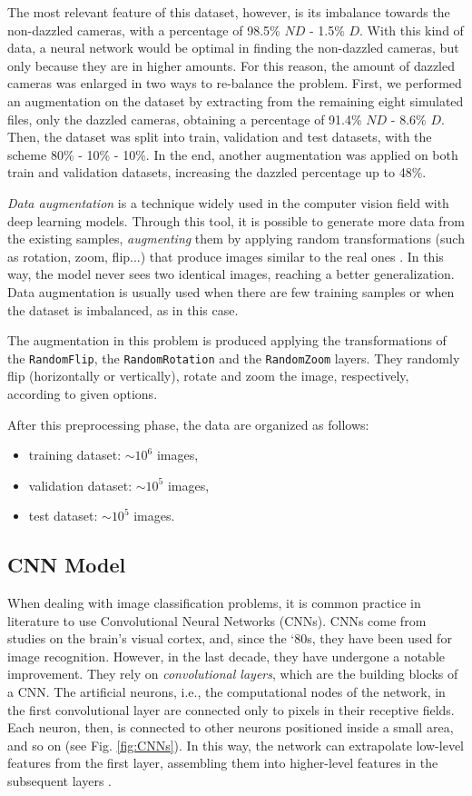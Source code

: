 The most relevant feature of this dataset, however, is its imbalance towards the non-dazzled cameras, with a percentage of 98.5\% $ND$ - 1.5\% $D$. With this kind of data, a neural network would be optimal in finding the non-dazzled cameras, but only because they are in higher amounts. For this reason, the amount of dazzled cameras was enlarged in two ways to re-balance the problem. First, we performed an augmentation on the dataset by extracting from the remaining eight simulated files, only the dazzled cameras, obtaining a percentage of 91.4\% $ND$ - 8.6\% $D$. Then, the dataset was split into train, validation and test datasets, with the scheme 80\% - 10\% - 10\%. In the end, another augmentation was applied on both train and validation datasets, increasing the dazzled percentage up to 48\%. 

\textit{Data augmentation} is a technique widely used in the computer vision field with deep learning models. Through this tool, it is possible to generate more data from the existing samples, \textit{augmenting} them by applying random transformations (such as rotation, zoom, flip...) that produce images similar to the real ones \cite{CNN-book}. In this way, the model never sees two identical images, reaching a better generalization. Data augmentation is usually used when there are few training samples or when the dataset is imbalanced, as in this case. 

The augmentation in this problem is produced applying the transformations of the  \texttt{RandomFlip}, the \texttt{RandomRotation} and the \texttt{RandomZoom} layers. They randomly flip (horizontally or vertically), rotate and zoom the image, respectively, according to given options.

After this preprocessing phase, the data are organized as follows: 
\begin{itemize}
    \item training dataset: $\sim 10^6$ images,
    \item validation dataset: $\sim 10^5$ images,
    \item test dataset: $\sim 10^5$ images.
\end{itemize}

\subsection{CNN Model}
\label{cnn-model}
When dealing with image classification problems, it is common practice in literature to use Convolutional Neural Networks (CNNs). 
CNNs come from studies on the brain's visual cortex, and, since the ‘80s, they have been used for image recognition. However, in the last decade, they have undergone a notable improvement. They rely on \textit{convolutional layers}, which are the building blocks of a CNN. The artificial neurons, i.e., the computational nodes of the network, in the first convolutional layer are connected only to pixels in their receptive fields. Each neuron, then, is connected to other neurons positioned inside a small area, and so on (see Fig. \ref{fig:CNNs}). In this way, the network can extrapolate low-level features from the first layer, assembling them into higher-level features in the subsequent layers \cite{deep-learn-python}.

